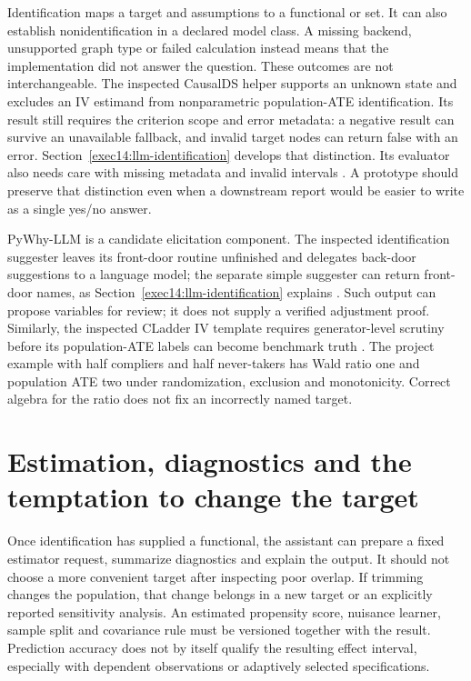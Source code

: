 Identification maps a target and assumptions to a functional or set. It can
also establish nonidentification in a declared model class. A missing backend,
unsupported graph type or failed calculation instead means that the
implementation did not answer the question. These outcomes are not
interchangeable. The inspected CausalDS helper supports an unknown state and excludes an IV
estimand from nonparametric population-ATE identification. Its result still
requires the criterion scope and error metadata: a negative result can survive
an unavailable fallback, and invalid target nodes can return false with an
error. Section~\ref{exec14:llm-identification} develops that distinction. Its
evaluator also needs care with missing metadata and invalid intervals
\cite{v12_la_package_causalds}. A prototype should preserve that distinction even
when a downstream report would be easier to write as a single yes/no answer.

PyWhy-LLM is a candidate elicitation component. The inspected identification
suggester leaves its front-door routine unfinished and delegates back-door
suggestions to a language model; the separate simple suggester can return
front-door names, as Section~\ref{exec14:llm-identification} explains
\cite{v12_la_package_pywhy_llm}. Such output can propose variables for review; it
does not supply a verified adjustment proof. Similarly, the inspected CLadder
IV template requires generator-level scrutiny before its population-ATE labels
can become benchmark truth \cite{v12_la_package_cladder}. The project example
with half compliers and half never-takers has Wald ratio one and population ATE
two under randomization, exclusion and monotonicity. Correct algebra for the
ratio does not fix an incorrectly named target.

\section{Estimation, diagnostics and the temptation to change the target}

Once identification has supplied a functional, the assistant can prepare a fixed
estimator request, summarize diagnostics and explain the output. It should not
choose a more convenient target after inspecting poor overlap. If trimming
changes the population, that change belongs in a new target or an explicitly
reported sensitivity analysis. An estimated propensity score, nuisance learner,
sample split and covariance rule must be versioned together with the result.
Prediction accuracy does not by itself qualify the resulting effect interval,
especially with dependent observations or adaptively selected specifications.


